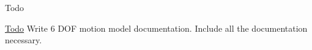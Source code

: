 \begin{DoxyRefDesc}{Todo}
\item[\hyperlink{todo__todo000006}{Todo}]Write 6 D\-O\-F motion model documentation. Include all the documentation necessary.\end{DoxyRefDesc}
